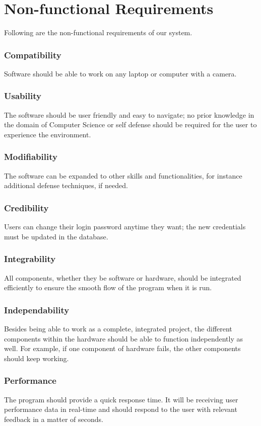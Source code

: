 
\section{Non-functional Requirements}
Following are the non-functional requirements of our system.
\subsubsection{Compatibility}
Software should be able to work on any laptop or computer with a camera.
\subsubsection{Usability}
The software should be user friendly and easy to navigate; no prior knowledge in the domain of Computer Science or self defense should be required for the user to experience the environment. 
\subsubsection{Modifiability}
The software can be expanded to other skills and functionalities, for instance additional defense techniques, if needed.
\subsubsection{Credibility}
Users can change their login password anytime they want; the new credentials must be updated in the database. 
\subsubsection{Integrability}
All components, whether they be software or hardware, should be integrated efficiently to ensure the smooth flow of the program when it is run. 
\subsubsection{Independability}
Besides being able to work as a complete, integrated project, the different components within the hardware should be able to function independently as well. For example, if one component of hardware fails, the other components should keep working. 
\subsubsection{Performance}
The program should provide a quick response time. It will be receiving user performance data in real-time and should respond to the user with relevant feedback in a matter of seconds.  
